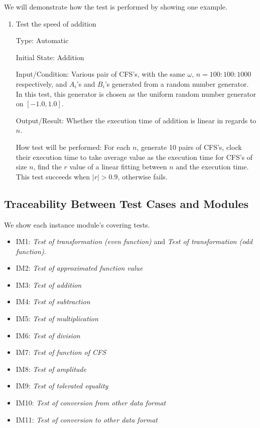 \documentclass[12pt, titlepage]{article}
\begin{document}
We will demonstrate how the test is performed by showing one example.
\begin{enumerate}
	
	\item{Test the speed of addition\\}
	
	Type: Automatic
	
	Initial State: Addition
	
	Input/Condition: Various pair of CFS's, with the same $\omega$, $n=100:100:1000$ respectively, and $A_i$'s and $B_i$'s generated from a random number generator. In this test, this generator is chosen as the uniform random number generator on $[-1.0, 1.0]$. 
	
	Output/Result: Whether the execution time of addition is linear in regards to $n$.
	
	How test will be performed: For each $n$, generate 10 pairs of CFS's, clock their execution time to take average value as the execution time for CFS's of size $n$, find the $r$ value of a linear fitting between $n$ and the execution time. This test succeeds when $|r|>0.9$, otherwise fails. 
	
\end{enumerate}

\subsection{Traceability Between Test Cases and Modules}
We show each instance module's covering tests.

\begin{itemize}
	\item IM1: \textit{Test of transformation (even function)} and \textit{Test of transformation (odd function)}.
	\item IM2: \textit{Test of approximated function value}
	\item IM3: \textit{Test of addition}
	\item IM4: \textit{Test of subtraction}
	\item IM5: \textit{Test of multiplication}
	\item IM6: \textit{Test of division}
	\item IM7: \textit{Test of function of CFS}
	\item IM8: \textit{Test of amplitude}
	\item IM9: \textit{Test of tolerated equality}
	\item IM10: \textit{Test of conversion from other data format}
	\item IM11: \textit{Test of conversion to other data format}
\end{itemize}
				



\end{document}

